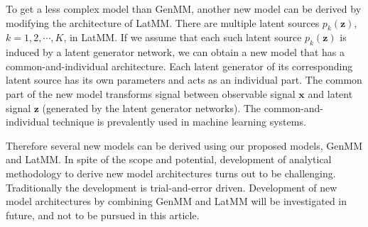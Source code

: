 To get a less complex model than GenMM, another new model can be derived by modifying the architecture of LatMM. There are multiple latent sources $p_k(\bm{z})$, $k=1, 2, \cdots, K$, in LatMM. If we assume that each such latent source $p_k(\bm{z})$ is induced by a latent generator network, we can obtain a new model that has a common-and-individual architecture. Each latent generator of its corresponding latent source has its own parameters and acts as an individual part. The common part of the new model transforms signal between observable signal $\bm{x}$ and latent signal $\bm{z}$ (generated by the latent generator networks). The common-and-individual technique is prevalently used in machine learning systems\cite{sundman2016design, SUNDMAN2014298}.

Therefore several new models can be derived using our proposed models, GenMM and LatMM. In spite of the scope and potential, development of analytical methodology to derive new model architectures turns out to be challenging. Traditionally the development is trial-and-error driven. Development of new model architectures by combining GenMM and LatMM will be investigated in future, and not to be pursued in this article.   



